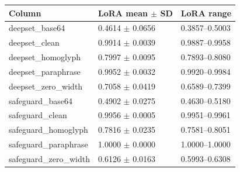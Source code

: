 \begin{tabular}{lll}
\toprule
Column & LoRA mean $\pm$ SD & LoRA range\\
\midrule
deepset\_base64 & 0.4614 $\pm$ 0.0656 & 0.3857--0.5003\\
deepset\_clean & 0.9914 $\pm$ 0.0039 & 0.9887--0.9958\\
deepset\_homoglyph & 0.7997 $\pm$ 0.0095 & 0.7893--0.8080\\
deepset\_paraphrase & 0.9952 $\pm$ 0.0032 & 0.9920--0.9984\\
deepset\_zero\_width & 0.7058 $\pm$ 0.0419 & 0.6589--0.7399\\
safeguard\_base64 & 0.4902 $\pm$ 0.0275 & 0.4630--0.5180\\
safeguard\_clean & 0.9956 $\pm$ 0.0005 & 0.9951--0.9961\\
safeguard\_homoglyph & 0.7816 $\pm$ 0.0235 & 0.7581--0.8051\\
safeguard\_paraphrase & 1.0000 $\pm$ 0.0000 & 1.0000--1.0000\\
safeguard\_zero\_width & 0.6126 $\pm$ 0.0163 & 0.5993--0.6308\\
\bottomrule\end{tabular}
